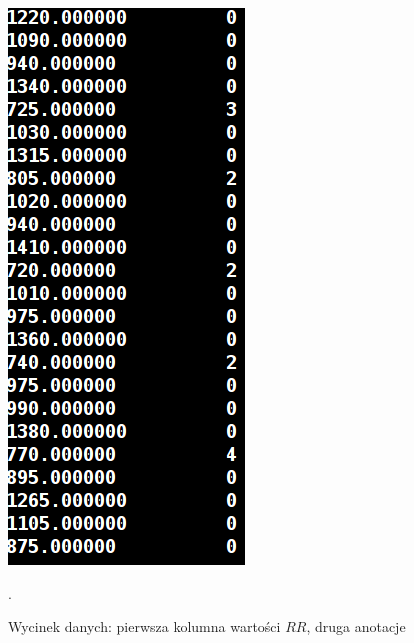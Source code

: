 \begin{figure}
\centering
\includegraphics[scale=0.5]{graph/strip_data.png}
\caption{Wycinek danych: pierwsza kolumna wartości $RR$, druga anotacje}.
\label{fig:strip_data}
\end{figure}